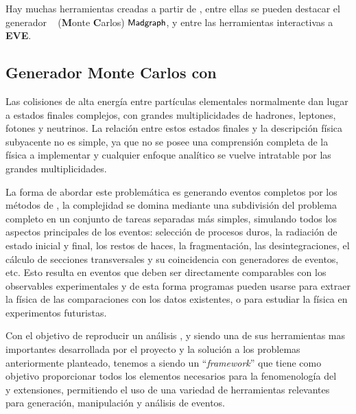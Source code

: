 Hay muchas herramientas creadas a partir de \ROOT, entre ellas se pueden destacar el generador \MC ~ (\textbf{M}onte \textbf{C}arlos) $\textsf{\small Madgraph}$, y entre las herramientas interactivas a \textbf{EVE}.


\subsection{Generador Monte Carlos con }\label{C_madgraph}

Las colisiones de alta energía entre partículas elementales normalmente dan lugar a estados finales complejos, con grandes multiplicidades de hadrones, leptones, fotones y neutrinos. La relación entre estos estados finales y la descripción física subyacente no es simple, ya que no se posee una comprensión completa de la física a implementar y cualquier enfoque analítico se vuelve intratable por las grandes multiplicidades.

La forma de abordar este problemática es generando eventos completos por los métodos de \MC, la complejidad se domina mediante una subdivisión del problema completo en un conjunto de tareas separadas más simples, simulando todos los aspectos principales de los eventos: selección de procesos duros, la radiación de estado inicial y final, los restos de haces, la fragmentación, las desintegraciones, el cálculo de secciones transversales y su coincidencia con generadores de eventos, etc. Esto resulta en eventos que deben ser directamente comparables con los observables experimentales y de esta forma programas pueden usarse para extraer la física de las comparaciones con los datos existentes, o para estudiar la física en experimentos futuristas.

Con el objetivo de reproducir un análisis \LHC, y siendo una de sus herramientas mas importantes desarrollada por el proyecto y la solución a los problemas anteriormente planteado, tenemos a  \citep{alwall_automated_2014} siendo un ``\textit{framework}'' que tiene como objetivo proporcionar todos los elementos necesarios para la fenomenología del \ME ~ y extensiones, permitiendo el uso de una variedad de herramientas relevantes para generación, manipulación y análisis de eventos. 

